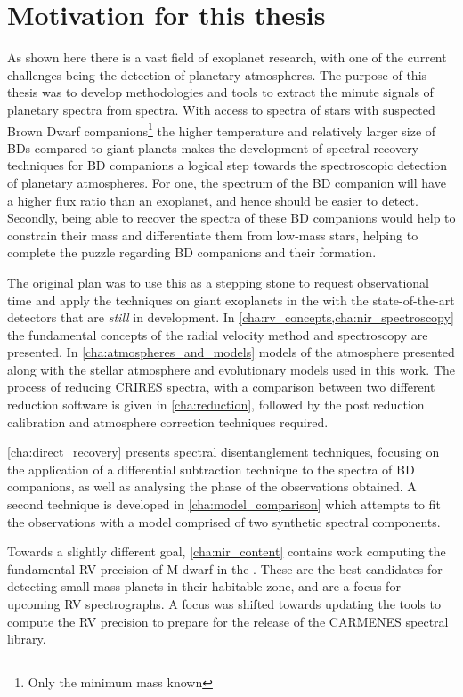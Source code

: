 \section{Motivation for this thesis}
\label{sec:thesis_motivation}

As shown here there is a vast field of exoplanet research, with one of the current challenges being the detection of planetary atmospheres.
The purpose of this thesis was to develop methodologies and tools to extract the minute signals of planetary spectra from \nir{} spectra.
With access to \nir{} spectra of stars with suspected Brown Dwarf companions\footnote{Only the minimum mass \Mtwosini known} the higher temperature and relatively larger size of BDs compared to giant-planets makes the development of spectral recovery techniques for BD companions a logical step towards the spectroscopic detection of planetary atmospheres.
For one, the spectrum of the BD companion will have a higher flux ratio than an exoplanet, and hence should be easier to detect.
Secondly, being able to recover the spectra of these BD companions would help to constrain their mass and differentiate them from low-mass stars, helping to complete the puzzle regarding BD companions and their formation.

The original plan was to use this as a stepping stone to request observational time and apply the techniques on giant exoplanets in the \nir{} with the state-of-the-art detectors that are \emph{still} in development.
In \cref{cha:rv_concepts,cha:nir_spectroscopy} the fundamental concepts of the radial velocity method and \nir{} spectroscopy are presented. In \cref{cha:atmospheres_and_models} models of the atmosphere presented along with the stellar atmosphere and evolutionary models used in this work.
The process of reducing \nir{} {CRIRES} spectra, with a comparison between two different reduction software is given in \cref{cha:reduction}, followed by the post reduction calibration and atmosphere correction techniques required.

\cref{cha:direct_recovery} presents spectral disentanglement techniques, focusing on the application of a differential subtraction technique to the \nir{} spectra of BD companions, as well as analysing the phase of the observations obtained.
A second technique is developed in \cref{cha:model_comparison} which attempts to fit the observations with a model comprised of two synthetic spectral components.

Towards a slightly different goal, \cref{cha:nir_content} contains work computing the fundamental RV precision of {M-dwarf} in the \nir{}.
These are the best candidates for detecting small mass planets in their habitable zone, and are a focus for upcoming \nir{} RV spectrographs.
A focus was shifted towards updating the tools to compute the RV precision to prepare for the release of the CARMENES \nir{} spectral library.
